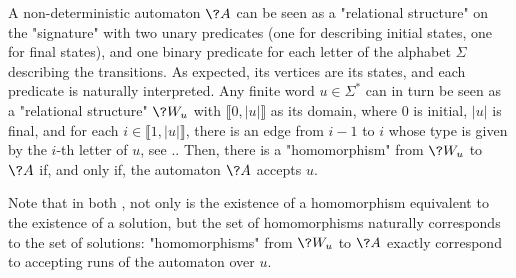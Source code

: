 \begin{example}
	\AP\label{ex:auto-as-rel}
	A non-deterministic automaton $\?A$ can be seen as a "relational structure"
	on the "signature" with two unary predicates (one for
	describing initial states, one for final states), and one binary predicate
	for each letter of the alphabet $\Sigma$ describing the transitions.
	As expected, its vertices are its states, 
	and each predicate is naturally interpreted.
	Any finite word $u\in \Sigma^*$ can in turn be seen as a "relational structure"
	$\?W_u$ with $\lBrack 0,|u|\rBrack$ as its domain,
	where $0$ is initial, $|u|$ is final, and
	for each $i \in \lBrack 1,|u|\rBrack$, there is an edge from $i-1$ to $i$
	whose type is given by the $i$-th letter of $u$, see ..
	Then, there is a "homomorphism" from $\?W_u$ to $\?A$ if, and only if, 
	the automaton $\?A$ accepts $u$.
\end{example}

Note that in both ,
not only is the existence of a homomorphism equivalent to the existence of a solution, but the set 
of homomorphisms naturally corresponds to the set of solutions: "homomorphisms" from $\?W_u$
to $\?A$ exactly correspond to accepting runs of the automaton over $u$.

